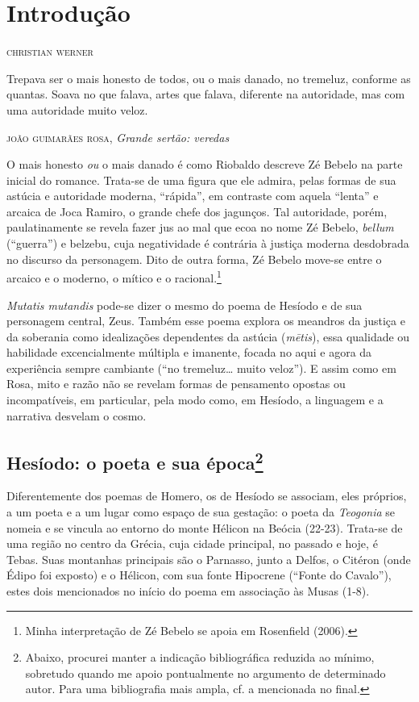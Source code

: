 \chapter{Introdução}

\begin{flushright}
\textsc{christian werner}
\end{flushright}

\epigraph{Trepava ser o mais honesto de todos, ou o mais
danado, no tremeluz, conforme as quantas. Soava
no que falava, artes que falava, diferente
na autoridade, mas com uma autoridade muito veloz.}{\textsc{joão guimarães rosa}, \emph{Grande sertão: veredas}}

\noindent{}O mais honesto \emph{ou} o mais danado é como Riobaldo descreve Zé
Bebelo na parte inicial do romance. Trata-se de uma figura que ele
admira, pelas formas de sua astúcia e autoridade moderna, ``rápida'', em
contraste com aquela ``lenta'' e arcaica de Joca Ramiro, o grande chefe
dos jagunços. Tal autoridade, porém, paulatinamente se revela fazer jus
ao mal que ecoa no nome Zé Bebelo, \emph{bellum} (``guerra'') e belzebu,
cuja negatividade é contrária à justiça moderna desdobrada no discurso
da personagem. Dito de outra forma, Zé Bebelo move-se entre o arcaico e
o moderno, o mítico e o racional.\footnote{Minha interpretação de Zé
  Bebelo se apoia em Rosenfield (2006).}

\emph{Mutatis mutandis} pode-se dizer o mesmo do poema de Hesíodo e de
sua personagem central, Zeus. Também esse poema explora os meandros da
justiça e da soberania como idealizações dependentes da astúcia
(\emph{mētis}), essa qualidade ou habilidade excencialmente múltipla e
imanente, focada no aqui e agora da experiência sempre cambiante (``no
tremeluz\ldots{} muito veloz''). E assim como em Rosa, mito e razão não
se revelam formas de pensamento opostas ou incompatíveis, em particular,
pela modo como, em Hesíodo, a linguagem e a narrativa desvelam o cosmo.

\section{Hesíodo: o poeta e sua época\protect\footnote{\MakeUppercase{A}baixo, procurei manter a
  indicação bibliográfica reduzida ao mínimo, sobretudo quando me apoio
  pontualmente no argumento de determinado autor. \MakeUppercase{P}ara uma bibliografia
  mais ampla, cf. a mencionada no final.}}

Diferentemente dos poemas de Homero, os de Hesíodo se associam, eles
próprios, a um poeta e a um lugar como espaço de sua gestação: o poeta
da \emph{Teogonia} se nomeia e se vincula ao entorno do monte Hélicon na
Beócia (22-23). Trata-se de uma região no centro da Grécia, cuja cidade
principal, no passado e hoje, é Tebas. Suas montanhas principais são o
Parnasso, junto a Delfos, o Citéron (onde Édipo foi exposto) e o
Hélicon, com sua fonte Hipocrene (``Fonte do Cavalo''), estes dois
mencionados no início do poema em associação às Musas (1-8).

